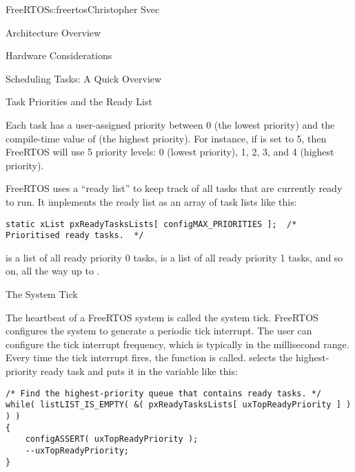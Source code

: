\begin{aosachapter}{FreeRTOS}{s:freertos}{Christopher Svec}
\begin{aosasect1}{Architecture Overview}
\begin{aosasect2}{Hardware Considerations}
\end{aosasect2}

\end{aosasect1}

\begin{aosasect1}{Scheduling Tasks: A Quick Overview}


\begin{aosasect2}{Task Priorities and the Ready List}

Each task has a user-assigned priority between 0 (the lowest priority)
and the compile-time value of  (the
highest priority). For instance, if  is
set to 5, then FreeRTOS will use 5 priority levels: 0 (lowest
priority), 1, 2, 3, and 4 (highest priority).

FreeRTOS uses a ``ready list'' to keep track of all tasks that are
currently ready to run. It implements the ready list as an array of
task lists like this:

\begin{verbatim}
static xList pxReadyTasksLists[ configMAX_PRIORITIES ];  /* Prioritised ready tasks.  */
\end{verbatim}

\noindent {} is a list of all ready priority 0 tasks,
 is a list of all ready priority 1 tasks,
and so on, all the way up to
.

\end{aosasect2}

\begin{aosasect2}{The System Tick}

The heartbeat of a FreeRTOS system is called the system tick. FreeRTOS
configures the system to generate a periodic tick interrupt. The user
can configure the tick interrupt frequency, which is typically in the
millisecond range.  Every time the tick interrupt fires, the
 function is called.
 selects the highest-priority ready task
and puts it in the  variable like this:

\begin{verbatim}
/* Find the highest-priority queue that contains ready tasks. */
while( listLIST_IS_EMPTY( &( pxReadyTasksLists[ uxTopReadyPriority ] ) ) )
{
    configASSERT( uxTopReadyPriority );
    --uxTopReadyPriority;
}


\end{verbatim}
\end{aosasect2}
\end{aosasect1}
\end{aosachapter}
